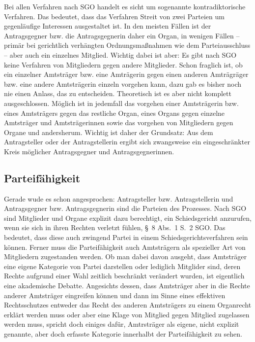 Bei allen Verfahren nach SGO handelt es sicht um sogenannte kontradiktorische Verfahren.
Das bedeutet, dass das Verfahren Streit von zwei Parteien um gegenläufige Interessen ausgestaltet ist.
In den meisten Fällen ist der Antragsgegner bzw. die Antragsgegnerin daher ein Organ, in wenigen Fällen -- primär bei gerichtlich verhängten Ordnungsmaßnahmen wie dem Parteiausschluss -- aber auch ein einzelnes Mitglied.
Wichtig dabei ist aber: Es gibt nach SGO keine Verfahren von Mitgliedern gegen andere Mitglieder.
Schon fraglich ist, ob ein einzelner Amtsträger bzw. eine Amträgerin gegen einen anderen Amträgräger bzw. eine andere
Amtsträgerin einzeln vorgehen kann, dazu gab es bisher noch nie einen Anlass, das zu entscheiden.
Theoretisch ist es aber nicht komplett ausgeschlossen.
Möglich ist in jedemfall das vorgehen einer Amtsträgerin bzw. eines Amtsträgers gegen das restliche Organ, eines Organs  gegen einzelne Amtsträger und Amtsträgerinnen sowie das vorgehen von Mitgliedern gegen Organe und andersherum.
Wichtig ist daher der Grundsatz: Aus dem Antragsteller oder der Antragstellerin ergibt sich zwangsweise ein eingeschränkter Kreis möglicher Antragsgegner und Antragsgegnerinnen.

\subsection{Parteifähigkeit}
\label{Anrufung:Statthaftigkeit:Parteifaehigkeit}
Gerade wude es schon angesprochen: Antragsteller bzw. Antragstellerin und Antragsgegner bzw. Antragsgegnerin sind die Parteien des Prozesses.
Nach SGO sind Mitglieder und Organe explizit dazu berechtigt, ein Schiedsgericht anzurufen, wenn sie sich in ihren Rechten verletzt fühlen, \S~8 Abs.~1 S.~2 SGO.
Das bedeutet, dass diese auch zwingend Partei in einem Schiedsgerichtsverfahren sein können.
Ferner muss die Parteifähigkeit auch Amtsträgern als spezieller Art von Mitgliedern zugestanden werden.
Ob man dabei davon ausgeht, dass Amtsträger eine eigene Kategorie von Partei darstellen oder lediglich Mitglider sind, deren Rechte aufgrund einer Wahl zeitlich beschränkt verändert wurden, ist eigentlich eine akademische Debatte.
Angesichts dessen, dass Amtsträger aber in die Rechte anderer Amtsträger eingreifen können und dann im Sinne eines effektiven Rechtsschutzes entweder das Recht des anderen Amtsträgers zu einem Organrecht erklärt werden muss oder aber eine Klage von Mitglied gegen Mitglied zugelassen werden muss, spricht doch einiges dafür, Amtrsträger als eigene, nicht explizit genannte,  aber doch erfasste Kategorie innerhalbt der Parteifähigkeit zu sehen.

